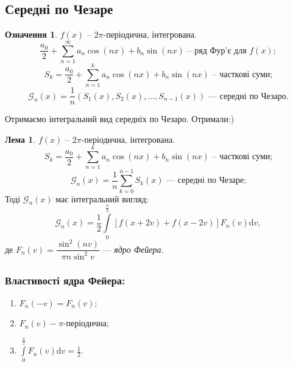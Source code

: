 \documentclass[a4paper]{scrartcl}
\theoremstyle{definition}
\newtheorem*{defo}{Означення}
\newtheorem*{lemme}{Лема}
\theoremstyle{remark}
\theoremstyle{definition}
\theoremstyle{definition}
\begin{document}
\subsection{Середні по Чезаре}
\begin{defo}
$f(x)$ -- $2\pi$-періодична, інтегрована.
$$
\frac{a_0}{2} +  \sum\limits_{n =1}^{\infty}{ a_n\cos{(nx)} + b_n \sin{(nx)}} \text{ -- ряд Фур'є для } f(x);
$$
$$
S_k = \frac{a_0}{2} +  \sum\limits_{n =1}^{k}{ a_n\cos{(nx)} + b_n \sin{(nx)}} \text{ -- часткові суми;}
$$
$$
\mathcal{G}_n(x) = \frac{1}{n}(S_1(x), S_2(x), \dots, S_{n-1}(x)) \textit{ --- середні по Чезаро.}
$$
\end{defo}
Отримаємо інтегральний вид середніх по Чезаро. Отримали:)
\begin{lemme} $f(x)$ -- $2\pi$-періодична, інтегрована.
  $$
  S_k = \frac{a_0}{2} +  \sum\limits_{n =1}^{k}{ a_n\cos{(nx)} + b_n \sin{(nx)}} \text{ -- часткові суми;}
  $$
  $$
  \mathcal{G}_n(x) = \frac{1}{n}  \sum\limits_{k = 0}^{n-1}{ S_k (x)}  \text{ --- середні по Чезаре;}
  $$
  Тоді  $\mathcal{G}_n(x) $ має інтегральний вигляд:
  $$
  \mathcal{G}_n(x) = \frac{1}{2} \int\limits_{0}^{ \frac{\pi}{2} }{ \left[ f(x  + 2 v) + f(x - 2v) \right] F_n(v) \mathrm{d} v} ,
  $$
 де $F_n (v) = \dfrac{\sin^2 (nv)}{\pi n \sin^2 v} $ --- \textit{ядро Фейера}.
\end{lemme}
\subsubsection*{Властивості ядра Фейера:}
\begin{enumerate}
  \item $F_n (-v) = F_n (v)$;
  \item $F_n (v) - \pi$-періодична;
  \item $\displaystyle \int\limits_{0}^{ \frac{\pi}{2}}{F_n (v) \mathrm{d} v} = \frac{1}{2} $.
\end{enumerate}
\end{document}
